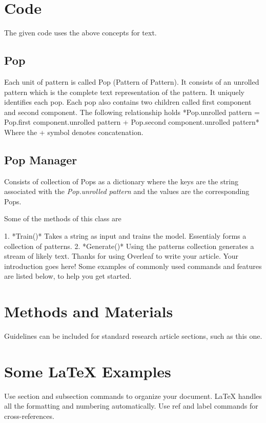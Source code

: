 \documentclass[fleqn,10pt]{olplainarticle}
\begin{document}
\section*{Code}
The given code uses the above concepts for text. 

\subsection{Pop}
Each unit of pattern is called Pop (Pattern of Pattern). It consists of an unrolled pattern which is the complete text representation of the pattern. It uniquely identifies each pop. Each pop also contains two children called first component and second component. 
The following relationship holds 
*Pop.unrolled pattern = Pop.first component.unrolled pattern + Pop.second component.unrolled pattern*
Where the + symbol denotes concatenation. 

\subsection{Pop Manager}
Consists of collection of Pops as a dictionary where the keys are the string associated with the \textit{Pop.unrolled pattern} and the values are the corresponding Pops.

Some of the methods of this class are 

1. *Train()* Takes a string as input and trains the model. Essentialy forms a collection of patterns.
2. *Generate()* Using the patterns collection generates a stream of likely text. 
Thanks for using Overleaf to write your article. Your introduction goes here! Some examples of commonly used commands and features are listed below, to help you get started.

\section*{Methods and Materials}

Guidelines can be included for standard research article sections, such as this one.

\section*{Some \LaTeX{} Examples}
\label{sec:examples}

Use section and subsection commands to organize your document. \LaTeX{} handles all the formatting and numbering automatically. Use ref and label commands for cross-references.
\end{document}
